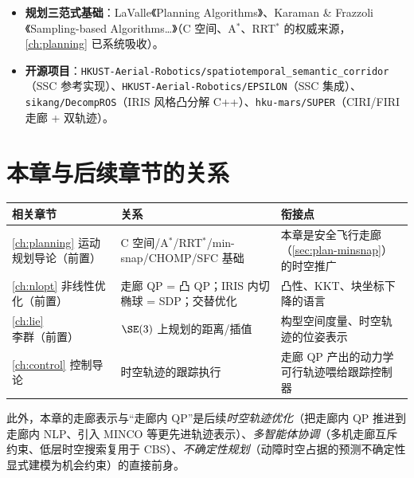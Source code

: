 \begin{itemize}
  \item \textbf{规划三范式基础}：LaValle《Planning Algorithms》\cite{lavalle2006planning}、Karaman \& Frazzoli《Sampling-based Algorithms\dots》\cite{karaman2011sampling}（C 空间、A$^*$、RRT$^*$ 的权威来源，\cref{ch:planning} 已系统吸收）。
  \item \textbf{开源项目}：\texttt{HKUST-Aerial-Robotics/spatiotemporal\_semantic\_corridor}（SSC 参考实现）、\texttt{HKUST-Aerial-Robotics/EPSILON}（SSC 集成）、\texttt{sikang/DecompROS}（IRIS 风格凸分解 C++）、\texttt{hku-mars/SUPER}（CIRI/FIRI 走廊 + 双轨迹）。
\end{itemize}

\section*{本章与后续章节的关系}
\begin{table}[H]\centering\small
\begin{tabular}{lll}
\toprule
相关章节 & 关系 & 衔接点 \\
\midrule
\cref{ch:planning} 运动规划导论（前置） & C 空间/A$^*$/RRT$^*$/min-snap/CHOMP/SFC 基础 & 本章是安全飞行走廊（\cref{sec:plan-minsnap}）的时空推广 \\
\cref{ch:nlopt} 非线性优化（前置） & 走廊 QP = 凸 QP；IRIS 内切椭球 = SDP；交替优化 & 凸性、KKT、块坐标下降的语言 \\
\cref{ch:lie} 李群（前置） & $\SE(3)$ 上规划的距离/插值 & 构型空间度量、时空轨迹的位姿表示 \\
\cref{ch:control} 控制导论 & 时空轨迹的跟踪执行 & 走廊 QP 产出的动力学可行轨迹喂给跟踪控制器 \\
\bottomrule
\end{tabular}
\end{table}
\noindent{}此外，本章的走廊表示与“走廊内 QP”是后续\emph{时空轨迹优化}（把走廊内 QP 推进到走廊内 NLP、引入 MINCO 等更先进轨迹表示）、\emph{多智能体协调}（多机走廊互斥约束、低层时空搜索复用于 CBS）、\emph{不确定性规划}（动障时空占据的预测不确定性显式建模为机会约束）的直接前身。

